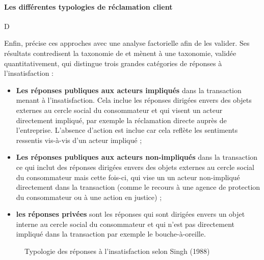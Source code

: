 \documentclass[a4paper,12pt, openany]{book}
\begin{document}
\paragraph{Les différentes typologies de réclamation client} D \parencite{singh88}

Enfin, \textcite{singh88} précise ces approches avec une analyse factorielle afin de les valider. Ses résultats contredisent la taxonomie de \textcite{day77} et mènent à une taxonomie, validée quantitativement, qui distingue trois grandes catégories de réponses à l'insatisfaction : \begin{itemize}
	\item \textbf{Les réponses publiques aux acteurs impliqués} dans la transaction menant à l'insatisfaction. Cela inclue les réponses dirigées envers des objets externes au cercle social du consommateur et qui visent un acteur directement impliqué, par exemple la réclamation directe auprès de l'entreprise. L'absence d'action est inclue car cela reflète les sentiments ressentis vis-à-vis d'un acteur impliqué ; 
	\item \textbf{Les réponses publiques aux acteurs non-impliqués} dans la transaction ce qui inclut des réponses dirigées envers des objets externes au cercle social du consommateur mais cette fois-ci, qui vise un un acteur non-impliqué directement dans la transaction (comme le recours à une agence de protection du consommateur ou à une action en justice) ;
	\item \textbf{les réponses privées} sont les réponses qui sont dirigées envers un objet interne au cercle social du consommateur et qui n'est pas directement impliqué dans la transaction par exemple le bouche-à-oreille.
\end{itemize}
\par %

\begin{figure}[H]
\centering
{}
\caption{Typologie des réponses à l’insatisfaction selon Singh (1988)}
\end{figure}
\end{document}
